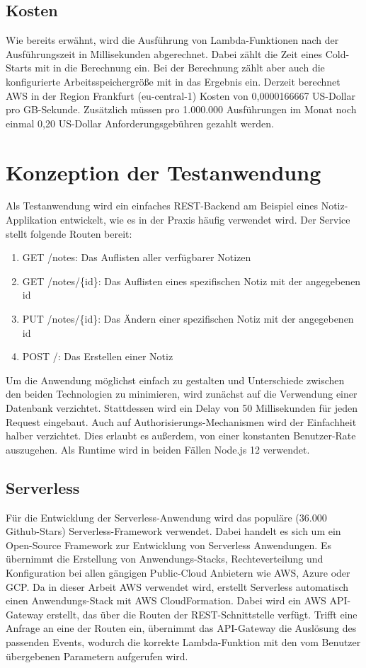 \subsection{Kosten}
Wie bereits erwähnt, wird die Ausführung von Lambda-Funktionen nach der Ausführungszeit in Millisekunden abgerechnet. Dabei zählt die Zeit eines Cold-Starts mit in die Berechnung ein. Bei der Berechnung zählt aber auch die konfigurierte Arbeitsspeichergröße mit in das Ergebnis ein. Derzeit berechnet AWS in der Region Frankfurt (eu-central-1) Kosten von 0,0000166667 US-Dollar pro GB-Sekunde\cite{noauthor_lambda_nodate}. Zusätzlich müssen pro 1.000.000 Ausführungen im Monat noch einmal 0,20 US-Dollar Anforderungsgebühren gezahlt werden.

\section{Konzeption der Testanwendung}
Als Testanwendung wird ein einfaches REST-Backend am Beispiel eines Notiz-Applikation entwickelt, wie es in der Praxis häufig verwendet wird. Der Service stellt folgende Routen bereit:  

\begin{enumerate}
    \item GET /notes: Das Auflisten aller verfügbarer Notizen
    \item GET /notes/\{id\}: Das Auflisten eines spezifischen Notiz mit der angegebenen id
    \item PUT /notes/\{id\}: Das Ändern einer spezifischen Notiz mit der angegebenen id
    \item POST /: Das Erstellen einer Notiz
\end{enumerate}

Um die Anwendung möglichst einfach zu gestalten und Unterschiede zwischen den beiden Technologien zu minimieren, wird zunächst auf die Verwendung einer Datenbank verzichtet. Stattdessen wird ein Delay von 50 Millisekunden für jeden Request eingebaut. 
Auch auf Authorisierungs-Mechanismen wird der Einfachheit halber verzichtet. Dies erlaubt es außerdem, von einer konstanten Benutzer-Rate auszugehen. 
Als Runtime wird in beiden Fällen Node.js 12 verwendet.

\subsection{Serverless}
Für die Entwicklung der Serverless-Anwendung wird das populäre (36.000 Github-Stars) Serverless-Framework\cite{noauthor_serverless_nodate} verwendet. Dabei handelt es sich um ein Open-Source Framework zur Entwicklung von Serverless Anwendungen. Es übernimmt die Erstellung von Anwendungs-Stacks, Rechteverteilung und Konfiguration bei allen gängigen Public-Cloud Anbietern wie AWS, Azure oder GCP. Da in dieser Arbeit AWS verwendet wird, erstellt Serverless automatisch einen Anwendungs-Stack mit AWS CloudFormation. Dabei wird ein AWS API-Gateway erstellt, das über die Routen der REST-Schnittstelle verfügt. Trifft eine Anfrage an eine der Routen ein, übernimmt das API-Gateway die Auslösung des passenden Events, wodurch die korrekte Lambda-Funktion mit den vom Benutzer übergebenen Parametern aufgerufen wird. 

